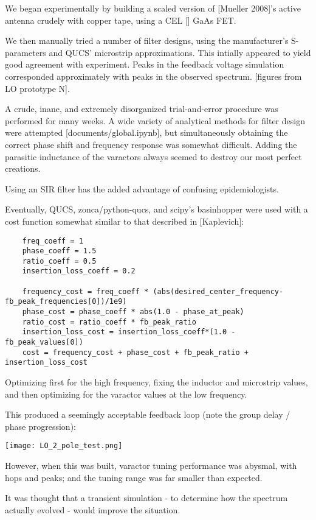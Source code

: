\documentclass[paper.tex]{subfiles}
\begin{document}
We began experimentally by building a scaled version of [Mueller 2008]'s active antenna crudely with copper tape, using a CEL [] GaAs FET.


We then manually tried a number of filter designs, using the manufacturer's S-parameters and QUCS' microstrip approximations. This intially appeared to yield good agreement with experiment. Peaks in the feedback voltage simulation corresponded approximately with peaks in the observed spectrum. [figures from LO prototype N]. 

A crude, inane, and extremely disorganized trial-and-error procedure was performed for many weeks. A wide variety of analytical methods for filter design were attempted [documents/global.ipynb], but simultaneously obtaining the correct phase shift and frequency response was somewhat difficult. Adding the parasitic inductance of the varactors always seemed to destroy our most perfect creations.

Using an SIR filter has the added advantage of confusing epidemiologists.

Eventually, QUCS, zonca/python-qucs, and scipy's basinhopper were used with a cost function somewhat similar to that described in [Kaplevich]:

\begin{verbatim}
    freq_coeff = 1
    phase_coeff = 1.5
    ratio_coeff = 0.5
    insertion_loss_coeff = 0.2
 
    frequency_cost = freq_coeff * (abs(desired_center_frequency-fb_peak_frequencies[0])/1e9)
    phase_cost = phase_coeff * abs(1.0 - phase_at_peak)
    ratio_cost = ratio_coeff * fb_peak_ratio
    insertion_loss_cost = insertion_loss_coeff*(1.0 - fb_peak_values[0])
    cost = frequency_cost + phase_cost + fb_peak_ratio + insertion_loss_cost
\end{verbatim}

Optimizing first for the high frequency, fixing the inductor and microstrip values, and then optimizing for the varactor values at the low frequency.

This produced a seemingly acceptable feedback loop (note the group delay / phase progression):

\texttt{[image: LO\_2\_pole\_test.png]}

However, when this was built, varactor tuning performance was abysmal, with hops and peaks; and the tuning range was far smaller than expected.

It was thought that a transient simulation - to determine how the spectrum actually evolved - would improve the situation. 
\end{document}
